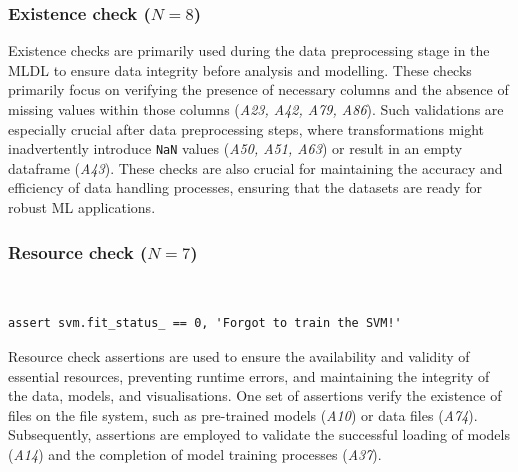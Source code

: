 \subsubsection{Existence check ($N = 8$)}

Existence checks are primarily used during the data preprocessing stage in the MLDL to ensure data integrity before analysis and modelling. These checks primarily focus on verifying the presence of necessary columns and the absence of missing values within those columns (\emph{A23, A42, A79, A86}). Such validations are especially crucial after data preprocessing steps, where transformations might inadvertently introduce \lstinline{NaN} values (\emph{A50, A51, A63}) or result in an empty dataframe (\emph{A43}). These checks are also crucial for maintaining the accuracy and efficiency of data handling processes, ensuring that the datasets are ready for robust ML applications.


\subsubsection{Resource check ($N = 7$)}~\label{sec:result-rq2-resource-check}

\begin{lstlisting}[caption={Assertion \emph{A37} used to ensure that an ML model has not reached an inconsistent state due to out-of-order or re-execution of code cells.}, label={lst:A37}]
assert svm.fit_status_ == 0, 'Forgot to train the SVM!'
\end{lstlisting}

Resource check assertions are used to ensure the availability and validity of essential resources, preventing runtime errors, and maintaining the integrity of the data, models, and visualisations. One set of assertions verify the existence of files on the file system, such as pre-trained models (\emph{A10}) or data files (\emph{A74}). Subsequently, assertions are employed to validate the successful loading of models (\emph{A14}) and the completion of model training processes (\emph{A37}).

